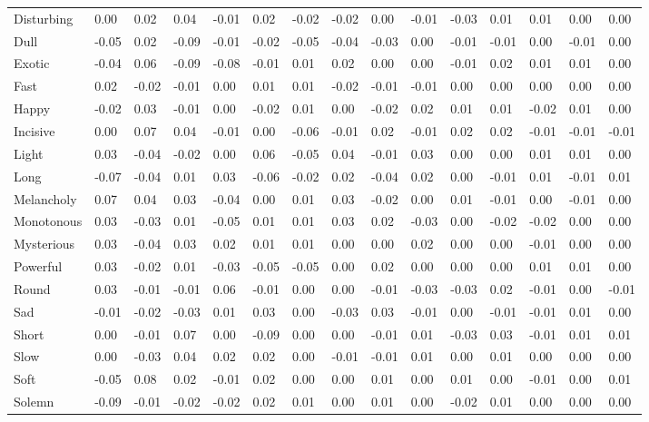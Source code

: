 \documentclass[
]{article}
\newenvironment{lltable}{\begin{landscape}\begin{center}\begin{ThreePartTable}}{\end{ThreePartTable}\end{center}\end{landscape}}
\begin{document}
\begin{lltable}
{\begin{longtable}{lllllllllllllll}
Disturbing & 0.00 & 0.02 & 0.04 & -0.01 & 0.02 & -0.02 & -0.02 & 0.00 & -0.01 & -0.03 & 0.01 & 0.01 & 0.00 & 0.00\\
Dull & -0.05 & 0.02 & -0.09 & -0.01 & -0.02 & -0.05 & -0.04 & -0.03 & 0.00 & -0.01 & -0.01 & 0.00 & -0.01 & 0.00\\
Exotic & -0.04 & 0.06 & -0.09 & -0.08 & -0.01 & 0.01 & 0.02 & 0.00 & 0.00 & -0.01 & 0.02 & 0.01 & 0.01 & 0.00\\
Fast & 0.02 & -0.02 & -0.01 & 0.00 & 0.01 & 0.01 & -0.02 & -0.01 & -0.01 & 0.00 & 0.00 & 0.00 & 0.00 & 0.00\\
Happy & -0.02 & 0.03 & -0.01 & 0.00 & -0.02 & 0.01 & 0.00 & -0.02 & 0.02 & 0.01 & 0.01 & -0.02 & 0.01 & 0.00\\
Incisive & 0.00 & 0.07 & 0.04 & -0.01 & 0.00 & -0.06 & -0.01 & 0.02 & -0.01 & 0.02 & 0.02 & -0.01 & -0.01 & -0.01\\
Light & 0.03 & -0.04 & -0.02 & 0.00 & 0.06 & -0.05 & 0.04 & -0.01 & 0.03 & 0.00 & 0.00 & 0.01 & 0.01 & 0.00\\
Long & -0.07 & -0.04 & 0.01 & 0.03 & -0.06 & -0.02 & 0.02 & -0.04 & 0.02 & 0.00 & -0.01 & 0.01 & -0.01 & 0.01\\
Melancholy & 0.07 & 0.04 & 0.03 & -0.04 & 0.00 & 0.01 & 0.03 & -0.02 & 0.00 & 0.01 & -0.01 & 0.00 & -0.01 & 0.00\\
Monotonous & 0.03 & -0.03 & 0.01 & -0.05 & 0.01 & 0.01 & 0.03 & 0.02 & -0.03 & 0.00 & -0.02 & -0.02 & 0.00 & 0.00\\
Mysterious & 0.03 & -0.04 & 0.03 & 0.02 & 0.01 & 0.01 & 0.00 & 0.00 & 0.02 & 0.00 & 0.00 & -0.01 & 0.00 & 0.00\\
Powerful & 0.03 & -0.02 & 0.01 & -0.03 & -0.05 & -0.05 & 0.00 & 0.02 & 0.00 & 0.00 & 0.00 & 0.01 & 0.01 & 0.00\\
Round & 0.03 & -0.01 & -0.01 & 0.06 & -0.01 & 0.00 & 0.00 & -0.01 & -0.03 & -0.03 & 0.02 & -0.01 & 0.00 & -0.01\\
Sad & -0.01 & -0.02 & -0.03 & 0.01 & 0.03 & 0.00 & -0.03 & 0.03 & -0.01 & 0.00 & -0.01 & -0.01 & 0.01 & 0.00\\
Short & 0.00 & -0.01 & 0.07 & 0.00 & -0.09 & 0.00 & 0.00 & -0.01 & 0.01 & -0.03 & 0.03 & -0.01 & 0.01 & 0.01\\
Slow & 0.00 & -0.03 & 0.04 & 0.02 & 0.02 & 0.00 & -0.01 & -0.01 & 0.01 & 0.00 & 0.01 & 0.00 & 0.00 & 0.00\\
Soft & -0.05 & 0.08 & 0.02 & -0.01 & 0.02 & 0.00 & 0.00 & 0.01 & 0.00 & 0.01 & 0.00 & -0.01 & 0.00 & 0.01\\
Solemn & -0.09 & -0.01 & -0.02 & -0.02 & 0.02 & 0.01 & 0.00 & 0.01 & 0.00 & -0.02 & 0.01 & 0.00 & 0.00 & 0.00\\

\end{longtable}}
\end{lltable}
\end{document}
